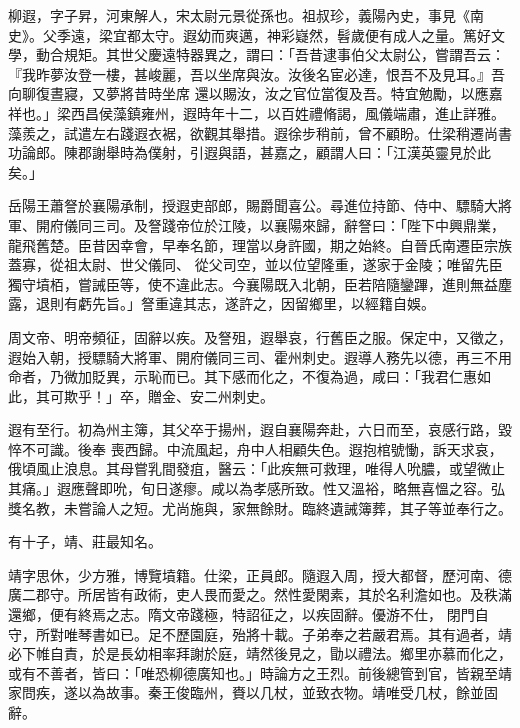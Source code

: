 \begin{pinyinscope}
 柳遐，字子昇，河東解人，宋太尉元景從孫也。祖叔珍，義陽內史，事見《南史》。父季遠，梁宜都太守。遐幼而爽邁，神彩嶷然，髫歲便有成人之量。篤好文學，動合規矩。其世父慶遠特器異之，謂曰：「吾昔逮事伯父太尉公，嘗謂吾云：『我昨夢汝登一樓，甚峻麗，吾以坐席與汝。汝後名宦必達，恨吾不及見耳。』吾向聊復晝寢，又夢將昔時坐席
 還以賜汝，汝之官位當復及吾。特宜勉勵，以應嘉祥也。」梁西昌侯藻鎮雍州，遐時年十二，以百姓禮脩謁，風儀端肅，進止詳雅。藻羨之，試遣左右踐遐衣裾，欲觀其舉措。遐徐步稍前，曾不顧盼。仕梁稍遷尚書功論郎。陳郡謝舉時為僕射，引遐與語，甚嘉之，顧謂人曰：「江漢英靈見於此矣。」



 岳陽王蕭詧於襄陽承制，授遐吏部郎，賜爵聞喜公。尋進位持節、侍中、驃騎大將軍、開府儀同三司。及詧踐帝位於江陵，以襄陽來歸，辭詧曰：「陛下中興鼎業，龍飛舊楚。臣昔因幸會，早奉名節，理當以身許國，期之始終。自晉氏南遷臣宗族蓋寡，從祖太尉、世父儀同、
 從父司空，並以位望隆重，遂家于金陵；唯留先臣獨守墳栢，嘗誡臣等，使不違此志。今襄陽既入北朝，臣若陪隨鑾蹕，進則無益塵露，退則有虧先旨。」詧重違其志，遂許之，因留鄉里，以經籍自娛。



 周文帝、明帝頻征，固辭以疾。及詧殂，遐舉哀，行舊臣之服。保定中，又徵之，遐始入朝，授驃騎大將軍、開府儀同三司、霍州刺史。遐導人務先以德，再三不用命者，乃微加貶異，示恥而已。其下感而化之，不復為過，咸曰：「我君仁惠如此，其可欺乎！」卒，贈金、安二州刺史。



 遐有至行。初為州主簿，其父卒于揚州，遐自襄陽奔赴，六日而至，哀感行路，毀悴不可識。後奉
 喪西歸。中流風起，舟中人相顧失色。遐抱棺號慟，訴天求哀，俄頃風止浪息。其母嘗乳間發疽，醫云：「此疾無可救理，唯得人吮膿，或望微止其痛。」遐應聲即吮，旬日遂瘳。咸以為孝感所致。性又溫裕，略無喜慍之容。弘獎名教，未嘗論人之短。尤尚施與，家無餘財。臨終遺誡簿葬，其子等並奉行之。



 有十子，靖、莊最知名。



 靖字思休，少方雅，博覽墳籍。仕梁，正員郎。隨遐入周，授大都督，歷河南、德廣二郡守。所居皆有政術，吏人畏而愛之。然性愛閑素，其於名利澹如也。及秩滿還鄉，便有終焉之志。隋文帝踐極，特詔征之，以疾固辭。優游不仕，
 閉門自守，所對唯琴書如已。足不歷園庭，殆將十載。子弟奉之若嚴君焉。其有過者，靖必下帷自責，於是長幼相率拜謝於庭，靖然後見之，勖以禮法。鄉里亦慕而化之，或有不善者，皆曰：「唯恐柳德廣知也。」時論方之王烈。前後總管到官，皆親至靖家問疾，遂以為故事。秦王俊臨州，賚以几杖，並致衣物。靖唯受几杖，餘並固辭。




\end{pinyinscope}
